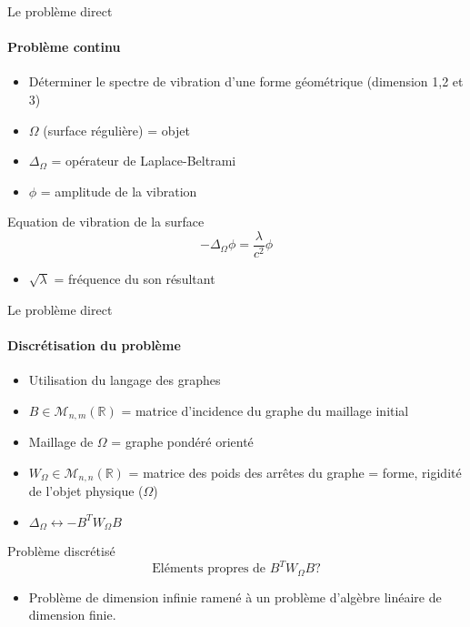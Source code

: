 \documentclass{beamer}
\begin{document}
\begin{frame}{Le problème direct}
  \framesubtitle{Problème continu}

\begin{itemize}
       \item Déterminer le spectre de vibration d'une forme géométrique (dimension 1,2 et 3)
        \item $\Omega$ (surface régulière) = objet
        \item $\Delta_\Omega$ = opérateur de Laplace-Beltrami  							          		    \item $\phi$ = amplitude de la vibration
        
\end{itemize}
\begin{block}{Equation de vibration de la surface}
\[-\Delta_\Omega\phi=\frac{\lambda}{c^2}\phi \]
\end{block}

\begin{itemize}
        \item $\sqrt{\lambda}$ = fréquence du son résultant
\end{itemize}
   
\end{frame}

\begin{frame}{Le problème direct}
  \framesubtitle{Discrétisation du problème}

\begin{itemize}
       \item Utilisation du langage des graphes
        \item $B\in\mathcal{M}_{n,m}(\mathbb{R})$ = matrice d'incidence du graphe du maillage initial
       \item Maillage de $\Omega$ = graphe pondéré orienté
       \item $W_\Omega\in\mathcal{M}_{n,n}(\mathbb{R})$ = matrice des poids des arrêtes du graphe = forme, rigidité de l'objet physique ($\Omega$)
       \item $\Delta_\Omega \longleftrightarrow -B^TW_\Omega B$
       
\end{itemize}
\begin{block}{Problème discrétisé}
\[\mbox{Eléments propres de } B^TW_\Omega B ?\]
\end{block}

\begin{itemize}
        \item Problème de dimension infinie ramené à un problème d'algèbre linéaire de dimension finie. 
\end{itemize}

\end{frame}
\end{document}
